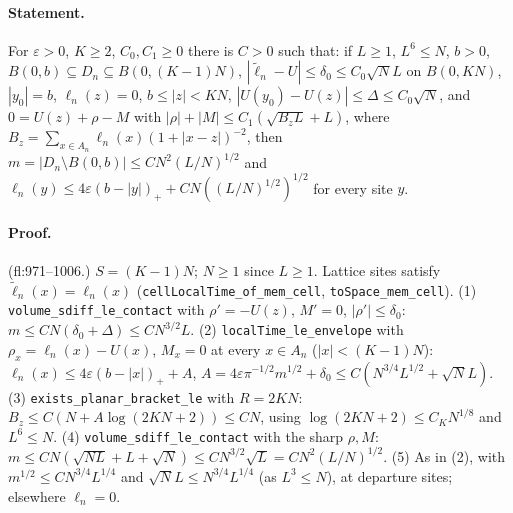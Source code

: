 \paragraph{Statement.} For $\varepsilon>0$, $K\geq2$, $C_0,C_1\geq0$ there is $C>0$ such that: if $L\geq1$, $L^6\leq N$, $b>0$, $B(0,b)\subseteq D_n\subseteq B(0,(K-1)N)$,
$|\widetilde\ell_n-U|\leq\delta_0\leq C_0\sqrt NL$ on $B(0,KN)$, $|y_0|=b$, $\ell_n(z)=0$, $b\leq|z|<KN$, $|U(y_0)-U(z)|\leq\Delta\leq C_0\sqrt N$, and
$0=U(z)+\rho-M$ with $|\rho|+|M|\leq C_1(\sqrt{B_zL}+L)$, where $B_z=\sum_{x\in A_n}\ell_n(x)(1+|x-z|)^{-2}$, then
$m=|D_n\setminus B(0,b)|\leq CN^2(L/N)^{1/2}$ and $\ell_n(y)\leq4\varepsilon(b-|y|)_++CN((L/N)^{1/2})^{1/2}$ for every site $y$.
\paragraph{Proof.} (fl:971--1006.) $S=(K-1)N$; $N\geq1$ since $L\geq1$. Lattice sites satisfy $\widetilde\ell_n(x)=\ell_n(x)$ (\texttt{cellLocalTime\_of\_mem\_cell}, \texttt{toSpace\_mem\_cell}).
(1) \texttt{volume\_sdiff\_le\_contact} with $\rho'=-U(z)$, $M'=0$, $|\rho'|\leq\delta_0$: $m\leq CN(\delta_0+\Delta)\leq CN^{3/2}L$.
(2) \texttt{localTime\_le\_envelope} with $\rho_x=\ell_n(x)-U(x)$, $M_x=0$ at every $x\in A_n$ ($|x|<(K-1)N$): $\ell_n(x)\leq4\varepsilon(b-|x|)_++A$, $A=4\varepsilon\pi^{-1/2}m^{1/2}+\delta_0\leq C(N^{3/4}L^{1/2}+\sqrt NL)$.
(3) \texttt{exists\_planar\_bracket\_le} with $R=2KN$: $B_z\leq C(N+A\log(2KN+2))\leq CN$, using $\log(2KN+2)\leq C_KN^{1/8}$ and $L^6\leq N$.
(4) \texttt{volume\_sdiff\_le\_contact} with the sharp $\rho,M$: $m\leq CN(\sqrt{NL}+L+\sqrt N)\leq CN^{3/2}\sqrt L=CN^2(L/N)^{1/2}$.
(5) As in (2), with $m^{1/2}\leq CN^{3/4}L^{1/4}$ and $\sqrt NL\leq N^{3/4}L^{1/4}$ (as $L^3\leq N$), at departure sites; elsewhere $\ell_n=0$.
